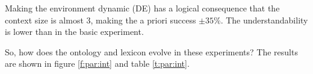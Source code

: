 Making the environment dynamic (DE) has a logical consequence that the context size is almost 3, making the a priori success $\pm 35$\%. The understandability is lower than in the basic experiment.


So, how does the ontology and lexicon evolve in these experiments? The results are shown in figure \ref{f:par:int} and table \ref{t:par:int}.

\begin{figure}
\centering
{}
\\
\\

\end{figure}
